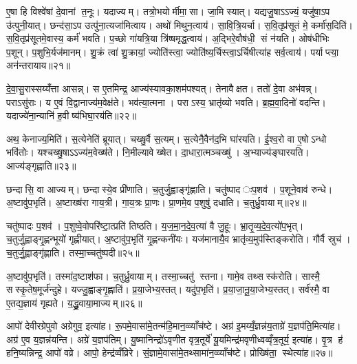 ए॒षा हि विश्वे॑षां दे॒वानां त॒नूः। यदाज्यम्। तत्रो॒भयोर्मीमा॒सा। जा॒मि स्यात्। यद्यजु॒षाऽऽज्यं॒ यजु॑षा॒ऽप उ॑त्पुनी॒यात्। छन्द॑सा॒ऽप उत्पु॑ना॒त्यजा॑मित्वाय। अथो॑ मिथुन॒त्वाय॑। सा॒वि॒त्रि॒यर्चा। स॒वि॒तृप्र॑सूतं मे॒ कर्मा॑स॒दिति॑। स॒वि॒तृप्र॑सूतमे॒वास्य॒ कर्म॑ भवति। प॒च्छो गा॑यत्रि॒या त्रि॑ष्षमृद्ध॒त्वाय॑। अ॒द्भिरे॒वौष॑धी॒ सं न॑यति। ओष॑धीभिः प॒शून्। प॒शुभि॒र्यज॑मानम्। शु॒क्रं त्वा॑ शु॒क्रायां॒ ज्योति॑स्त्वा॒ ज्योति॑ष्य॒र्चिस्त्वा॒ऽर्चिषीत्या॑ह सर्व॒त्वाय॑। पर्याप्त्या॒ अन॑न्तरायाय॥२१॥\anuvakamend[ई॒क्ष॒त॒ आ॒ह॒ शा॒स्ते॒ लो॒का दे॒वता॑ भवति॒ षट् च॑]

दे॒वा॒सु॒रास्सय्यँ॑त्ता आसन्न्। स ए॒तमिन्द्र॒ आज्य॑स्यावका॒शम॑पश्यत्। तेनावैक्षत। ततो॑ दे॒वा अभ॑वन्न्। पराऽसु॑राः। य ए॒वं वि॒द्वानाज्य॑म॒वेक्ष॑ते। भव॑त्या॒त्मना। पराऽस्य॒ भ्रातृ॑व्यो भवति। ब्र॒ह्म॒वा॒दिनो॑ वदन्ति। यदाज्ये॑ना॒न्यानि॑ ह॒वीष्य॑भिघा॒रय॑ति॥२२॥

अथ॒ केनाज्य॒मिति॑। स॒त्येनेति॑ ब्रूयात्। चख्षु॒र्वै स॒त्यम्। स॒त्येनै॒वैन॑द॒भि घा॑रयति। ई॒श्व॒रो वा ए॒षोऽन्धो भवि॑तोः। यश्चख्षु॒षाऽऽज्य॑म॒वेख्ष॑ते। नि॒मील्यावेख्षेत। दा॒धारा॒त्मञ्चख्षु॑। अ॒भ्याज्य॑ङ्घारयति। आज्य॑ङ्गृह्णाति॥२३॥

छन्दासि॒ वा आज्यम्। छन्दास्ये॒व प्री॑णाति। च॒तुर्जु॒ह्वाङ्गृ॑ह्णाति। चतु॑ष्पाद ःप॒शव॑। प॒शूने॒वाव॑ रुन्धे। अ॒ष्टावु॑प॒भृति॑। अ॒ष्टाख्ष॑रा गाय॒त्री। गा॒य॒त्रः प्रा॒णः। प्रा॒णमे॒व प॒शुषु॑ दधाति। च॒तुर्ध्रु॒वायाम्॥२४॥

चतु॑ष्पादः प॒शव॑। प॒शुष्वे॒वोपरि॑ष्टा॒त्प्रति॑ तिष्ठति। य॒ज॒मा॒न॒दे॒व॒त्या॑ वै जु॒हूः। भ्रा॒तृ॒व्य॒दे॒व॒त्यो॑प॒भृत्। च॒तुर्जु॒ह्वाङ्गृ॒ह्णन्भूयो॑ गृह्णीयात्। अ॒ष्टावु॑प॒भृति॑ गृ॒ह्णन्कनी॑यः। यज॑मानायै॒व भ्रातृ॑व्य॒मुप॑स्तिङ्करोति। गौर्वै स्रुच॑। च॒तुर्जु॒ह्वाङ्गृ॑ह्णाति। तस्मा॒च्चतु॑ष्पदी॥२५॥

अ॒ष्टावु॑प॒भृति॑। तस्मा॑द॒ष्टाश॑फा। च॒तुर्ध्रु॒वायाम्। तस्मा॒च्चतु॑ स्तना। गामे॒व तथ्सस्क॑रोति। सास्मै॒ सस्कृ॒तेष॒मूर्ज॑न्दुहे। यज्जु॒ह्वाङ्गृ॒ह्णाति॑। प्र॒या॒जेभ्य॒स्तत्। यदु॑प॒भृति॑। प्र॒या॒जा॒नू॒या॒जेभ्य॒स्तत्। सर्व॑स्मै॒ वा ए॒तद्य॒ज्ञाय॑ गृह्यते। य॒द्ध्रु॒वाया॒माज्यम्॥२६॥\anuvakamend[अ॒भि॒घा॒रय॑ति गृह्णाति ध्रु॒वाया॒ञ्चतु॑ष्पदी प्रयाजानूया॒जेभ्य॒स्तद्द्वे च॑]

आपो॑ देवीरग्रेपुवो अग्रेगुव॒ इत्या॑ह। रू॒पमे॒वासा॑मे॒तन्म॑हि॒मान॒व्व्याँच॑ष्टे। अग्र॑ इ॒मय्यँ॒ज्ञन्न॑य॒ताग्रे॑ य॒ज्ञप॑ति॒मित्या॑ह। अग्र॑ ए॒व य॒ज्ञन्न॑यन्ति। अग्रे॑ य॒ज्ञप॑तिम्। यु॒ष्मानिन्द्रो॑ऽवृणीत वृत्र॒तूर्ये॑ यू॒यमिन्द्र॑मवृणीध्वव्वृँत्र॒तूर्य॒ इत्या॑ह। वृ॒त्र ह॑ हनि॒ष्यन्निन्द्र॒ आपो॑ वव्रे। आपो॒ हेन्द्र॑व्वँव्रिरे। सं॒ज्ञामे॒वासा॑मे॒तथ्सामा॑न॒व्व्याँच॑ष्टे। प्रोख्षि॑ता॒ स्थेत्या॑ह॥२७॥

